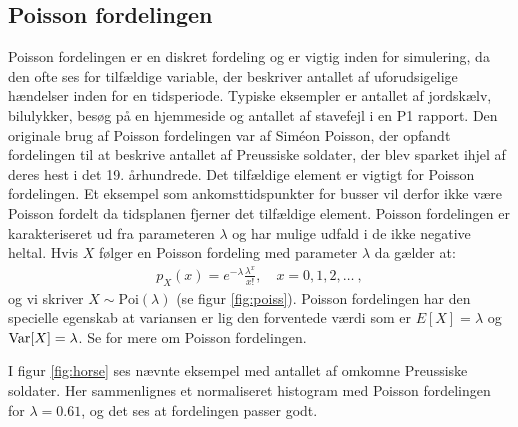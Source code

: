 \subsection{Poisson fordelingen}
Poisson fordelingen er en diskret fordeling og er vigtig inden for simulering, da den ofte ses for tilfældige variable, der beskriver antallet af uforudsigelige hændelser inden for en tidsperiode. Typiske eksempler er antallet af jordskælv, bilulykker, besøg på en hjemmeside og  antallet af stavefejl i en P1 rapport. Den originale brug af Poisson fordelingen var af Siméon Poisson, der opfandt fordelingen til at beskrive antallet af Preussiske soldater, der blev sparket ihjel af deres hest i det 19. århundrede. Det tilfældige element er vigtigt for Poisson fordelingen. Et eksempel som ankomsttidspunkter for busser vil derfor ikke være Poisson fordelt da tidsplanen fjerner det tilfældige element. Poisson fordelingen er karakteriseret ud fra parameteren $\lambda$ og har mulige udfald i de ikke negative heltal. Hvis $X$ følger en Poisson fordeling med parameter $\lambda$ da gælder at:
\begin{align*}
p_X(x) = e^{-\lambda}\frac{\lambda^x}{x!}, \quad x = 0,1,2,\dots \ ,
\end{align*}
og vi skriver $X \sim \text{Poi}(\lambda)$ (se figur \ref{fig:poiss}). Poisson fordelingen har den specielle egenskab at variansen er lig den forventede værdi som er $E[X] = \lambda$ og $\operatorname{Var}[X] = \lambda$. Se \cite[117-120]{olofsson2012} for mere om Poisson fordelingen. 
\begin{example}
I figur \ref{fig:horse} ses nævnte eksempel med antallet af omkomne Preussiske soldater. Her sammenlignes et normaliseret histogram med Poisson fordelingen for $\lambda = 0.61$, og det ses at fordelingen passer godt. 
\end{example}
